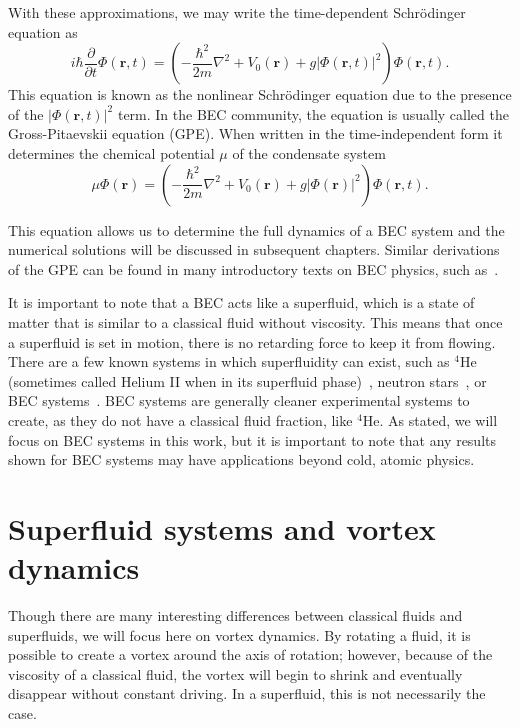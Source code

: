 With these approximations, we may write the time-dependent Schr\"odinger equation as
\begin{equation}
    i\hbar \frac{\partial}{\partial t}\Phi(\mathbf{r},t) = \left( - \frac{\hbar^2}{2m} \nabla^2 + V_0(\mathbf{r}) + g |\Phi(\mathbf{r},t)|^2\right)\Phi(\mathbf{r},t).
\end{equation}
This equation is known as the nonlinear Schr\"odinger equation due to the presence of the $|\Phi(\mathbf{r},t)|^2$ term.
In the BEC community, the equation is usually called the Gross-Pitaevskii equation (GPE).
When written in the time-independent form it determines the chemical potential $\mu$ of the condensate system~\cite{Gross1961, Pitaevskii1961}
\begin{equation}
    \mu\Phi(\mathbf{r}) = \left( - \frac{\hbar^2}{2m} \nabla^2 + V_0(\mathbf{r}) + g |\Phi(\mathbf{r})|^2\right)\Phi(\mathbf{r},t).
    \label{eqn:GP}
\end{equation}

This equation allows us to determine the full dynamics of a BEC system and the numerical solutions will be discussed in subsequent chapters.
Similar derivations of the GPE can be found in many introductory texts on BEC physics, such as~\cite{Fetter2003, Pethick2002, Fetter2009}.

It is important to note that a BEC acts like a superfluid, which is a state of matter that is similar to a classical fluid without viscosity.
This means that once a superfluid is set in motion, there is no retarding force to keep it from flowing.
There are a few known systems in which superfluidity can exist, such as $^4$He (sometimes called Helium II when in its superfluid phase)~\cite{Allen1938}, neutron stars~\cite{Migdal1960}, or BEC systems~\cite{Einstein1925, Anderson1995}.
BEC systems are generally cleaner experimental systems to create, as they do not have a classical fluid fraction, like $^4$He.
As stated, we will focus on BEC systems in this work, but it is important to note that any results shown for BEC systems may have applications beyond cold, atomic physics.

\section{Superfluid systems and vortex dynamics}

Though there are many interesting differences between classical fluids and superfluids, we will focus here on vortex dynamics.
By rotating a fluid, it is possible to create a vortex around the axis of rotation; however, because of the viscosity of a classical fluid, the vortex will begin to shrink and eventually disappear without constant driving.
In a superfluid, this is not necessarily the case.


